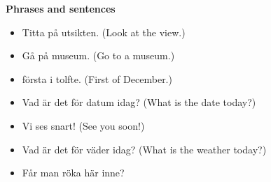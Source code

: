 
\begin{flushleft}
    \textbf{Phrases and sentences}
    \begin{itemize}
        \item Titta på utsikten. (Look at the view.)
        \item Gå på museum. (Go to a museum.)
        \item första i tolfte. (First of December.)
        \item Vad är det för datum idag? (What is the date today?)
        \item Vi ses snart! (See you soon!)
        \item Vad är det för väder idag? (What is the weather today?)
        \item Får man röka här inne?
    \end{itemize}
\end{flushleft}

